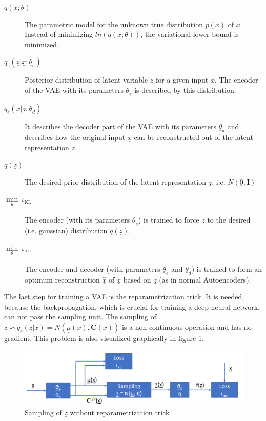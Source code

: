 \documentclass[12pt,DIV14,BCOR12mm,a4paper,footexclude,headinclude,halfparskip-,twoside,openright,openany,cleardoubleempty,idxtotoc,bibtotoc]{scrreprt} %
\numberwithin{equation}{chapter}
\begin{document}
\begin{description}
	\item[$q(\underline{x};\underline{\theta})$]The parametric model for the unknown true distribution $p(\underline{x})$ of $\underline{x}$. Instead of minimizing $ln(q(\underline{x};\underline{\theta}))$, the variational lower bound is minimized.
	\item[$q_e(\underline{z}|\underline{x};\underline{\theta}_e)$]Posterior distribution of latent variable $\underline{z}$ for a given input $\underline{x}$. The encoder of the VAE with its parameters $\underline{\theta}_e$ is described by this distribution.
	\item[$q_e(\underline{x}|\underline{z};\underline{\theta}_d)$]It describes the decoder part of the VAE with its parameters $\underline{\theta}_d$ and describes how the original input $\underline{x}$ can be reconstructed out of the latent representation $\underline{z}$
	\item[$q(\underline{z})$]The desired prior distribution of the latent representation $\underline{z}$, i.e. $N(\underline{0}, \mathbf{I})$
	\item[$\underset{\underline{\theta}}\min\ \iota_{\textrm{KL}}$]The encoder (with its parameters $\underline{\theta}_e$) is trained to force $\underline{z}$ to the desired (i.e. gaussian) distribution $q(\underline{z})$.
	\item[$\underset{\underline{\theta}}\min\ \iota_{\textrm{rec}}$]The encoder and decoder (with parameters $\underline{\theta}_e$ and $\underline{\theta}_d$) is trained to form an optimum reconstruction $\hat{\underline{x}}$ of $\underline{x}$ based on $\underline{z}$ (as in normal Autoencoders).
\end{description}
The last step for training a VAE is the reparametrization trick. It is needed, because the backpropagation, which is crucial for training a deep neural network, can not pass the sampling unit. The sampling of $\underline{z} \backsim q_e(\underline{z}|\underline{x}) = N(\underline{\mu}(\underline{x}), \mathbf{C}(\underline{x}))$ is a non-continuous operation and has no gradient. This problem is also visualized graphically in figure \ref{fig:Sampling_wo_reparametrization}.
\begin{figure}[htb!]
	\centering
	\includegraphics[width=0.75\linewidth]{Graphiken/VAE_wo_reparametrization}
	\caption{Sampling of $\underline{z}$ without reparametrization trick}
	\label{fig:Sampling_wo_reparametrization}
\end{figure}
\end{document}
